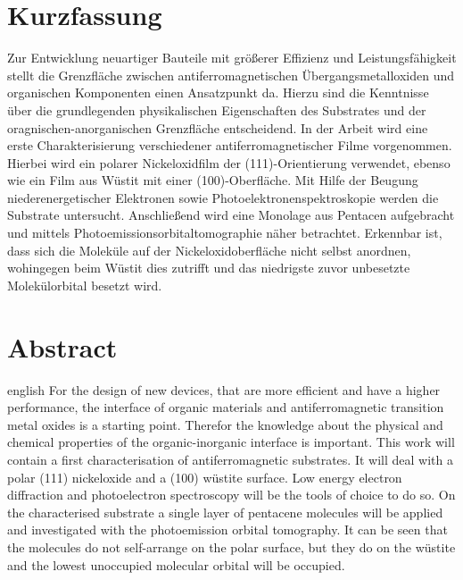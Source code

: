 \thispagestyle{plain}

\section*{Kurzfassung}
Zur Entwicklung neuartiger Bauteile mit größerer Effizienz und Leistungsfähigkeit stellt die Grenzfläche zwischen antiferromagnetischen Übergangsmetalloxiden und organischen Komponenten einen Ansatzpunkt da.
Hierzu sind die Kenntnisse über die grundlegenden physikalischen Eigenschaften des Substrates und der oragnischen-anorganischen Grenzfläche entscheidend.
In der Arbeit wird eine erste Charakterisierung verschiedener antiferromagnetischer Filme vorgenommen.
Hierbei wird ein polarer Nickeloxidfilm der (111)-Orientierung verwendet, ebenso wie ein Film aus Wüstit mit einer (100)-Oberfläche.
Mit Hilfe der Beugung niederenergetischer Elektronen sowie Photoelektronenspektroskopie werden die Substrate untersucht.
Anschließend wird eine Monolage aus Pentacen aufgebracht und mittels Photoemissionsorbitaltomographie näher betrachtet.
Erkennbar ist, dass sich die Moleküle auf der Nickeloxidoberfläche nicht selbst anordnen, wohingegen beim Wüstit dies zutrifft und das niedrigste zuvor unbesetzte Molekülorbital besetzt wird.

\section*{Abstract}
\begin{foreignlanguage}{english}
For the design of new devices, that are more efficient and have a higher performance, the interface of organic materials and antiferromagnetic transition metal oxides is a starting point.
Therefor the knowledge about the physical and chemical properties of the organic-inorganic interface is important.
This work will contain a first characterisation of antiferromagnetic substrates.
It will deal with a polar (111) nickeloxide and a (100) wüstite surface.
Low energy electron diffraction and photoelectron spectroscopy will be the tools of choice to do so.
On the characterised substrate a single layer of pentacene molecules will be applied and investigated with the photoemission orbital tomography.
It can be seen that the molecules do not self-arrange on the polar surface, but they do on the wüstite and the lowest unoccupied molecular orbital will be occupied.
\end{foreignlanguage}
